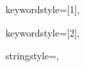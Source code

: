 {%
keywordstyle=[1]{\ttfamily\color{keywordcolor}},

keywordstyle=[2]{\ttfamily\color{sortcolor}},



stringstyle=\ttfamily,


}

